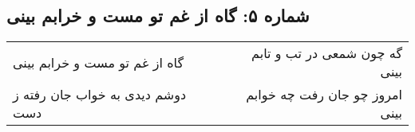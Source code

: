 \begin{center}
\section*{شماره ۵: گاه از غم تو مست و خرابم بینی}
\label{sec:005}
\begin{longtable}{l p{0.5cm} r}
گاه از غم تو مست و خرابم بینی
&&
گه چون شمعی در تب و تابم بینی
\\
دوشم دیدی به خواب جان رفته ز دست
&&
امروز چو جان رفت چه خوابم بینی
\\
\end{longtable}
\end{center}
